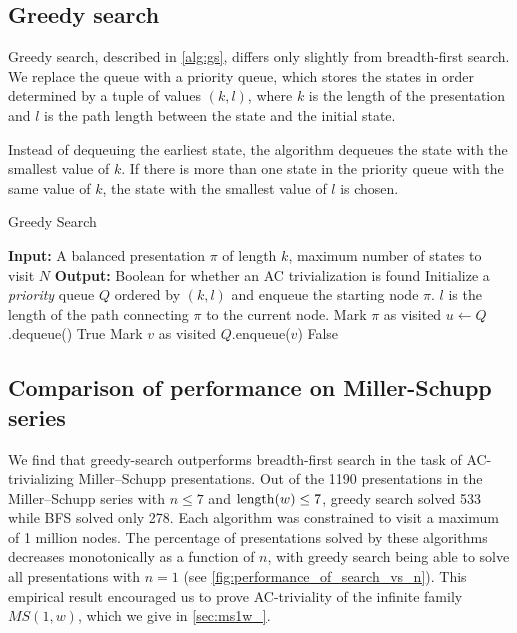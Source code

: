 \subsection{Greedy search}\label{ss:greedy_search}

Greedy search, described in \autoref{alg:gs}, differs only slightly from breadth-first search. We replace the queue with a priority queue, which stores the states in order determined by a tuple of values $(k, l)$, where $k$ is the length of the presentation and $l$ is the path length between the state and the initial state.

Instead of dequeuing the earliest state, the algorithm dequeues the state with the smallest value of $k$. If there is more than one state in the priority queue with the same value of $k$, the state with the smallest value of $l$ is chosen.

\begin{algorithm}
	\caption{Greedy Search}\label{alg:gs}
	\begin{algorithmic}[1] %
		\State \textbf{Input:} A balanced presentation $\pi$ of length $k$, maximum number of states to visit $N$
		\State \textbf{Output:} Boolean for whether an AC trivialization is found
		\State Initialize a \textit{priority} queue $Q$ ordered by $(k, l)$ and enqueue the starting node $\pi$.
		$l$ is the length of the path connecting $\pi$ to the current node.
		\State Mark $\pi$ as visited
		\State $u \gets Q$.dequeue() 
		\State \Return True 
		\EndIf
		\State Mark $v$ as visited
		\State $Q$.enqueue($v$) 
		\EndIf
		\EndFor
		\EndWhile
		\State \Return False 
	\end{algorithmic}
\end{algorithm}

\subsection{Comparison of performance on Miller-Schupp series}\label{sec:search-ms}

We find that greedy-search outperforms breadth-first search in the task of AC-trivializing Miller--Schupp presentations. %
Out of the 1190 presentations in the Miller--Schupp series with $n \leq 7$ and $\operatorname{length}(w) \leq 7$, greedy search solved 533 while BFS solved only 278.
Each algorithm was constrained to visit a maximum of 1 million nodes.
The percentage of presentations solved by these algorithms decreases monotonically as a function of $n$, with greedy search being able to solve all presentations with $n=1$ (see \autoref{fig:performance_of_search_vs_n}).
This empirical result encouraged us to prove AC-triviality of the infinite family $MS(1, w)$, which we give in \autoref{sec:ms1w_}.

